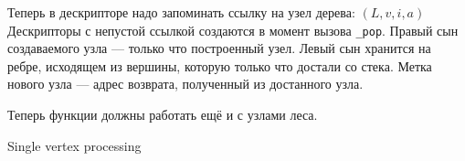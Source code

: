 \documentclass[12pt]{article}  %
\theoremstyle{definition}
\theoremstyle{remark}
\begin{document}
Теперь в дескрипторе надо запоминать ссылку на узел дерева: $(L, v, i, a)$
Дескрипторы с непустой ссылкой создаются в момент вызова \verb|_pop|. Правый сын создаваемого узла --- только что построенный узел. Левый сын хранится на ребре, исходящем из вершины, которую только что достали со стека.
Метка нового узла --- адрес возврата, полученный из достанного узла.

Теперь функции должны работать ещё и с узлами леса.

\begin{algorithm}[!ht]
\begin{algorithmic}[1]
\caption{Single vertex processing}
\label{processVertex}
  \EndIf
\EndFunction

      \EndFor
  \EndIf
\EndFunction

  \EndIf
      \EndFor
  \EndIf
\EndFunction

  \Else
  \EndIf
  \EndIf
\EndFunction





\end{algorithmic}
\end{algorithm}
\end{document}
